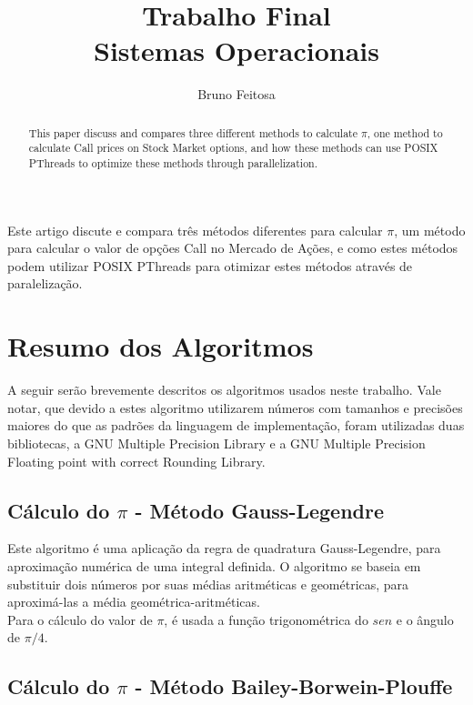 \documentclass[12pt]{article}
\title{Trabalho Final \\ Sistemas Operacionais}
\author{Bruno Feitosa\inst{1}}
\begin{document}
 

\maketitle

\begin{abstract}
This paper discuss and compares three different methods to calculate $\pi$,
one method to calculate Call prices on Stock Market options,
and how these methods can use POSIX PThreads to optimize these methods through parallelization.
\end{abstract}
     
\begin{resumo} 
Este artigo discute e compara três métodos diferentes para calcular $\pi$,
um método para calcular o valor de opções Call no Mercado de Ações,
e como estes métodos podem utilizar POSIX PThreads para otimizar estes métodos
através de paralelização.
\end{resumo}

\nocite{GNU:MP,GNU:MPFR}

\section{Resumo dos Algoritmos}

A seguir serão brevemente descritos os algoritmos usados neste trabalho.
Vale notar, que devido a estes algoritmo utilizarem números com tamanhos e precisões maiores
do que as padrões da linguagem de implementação, foram utilizadas duas bibliotecas,
a GNU Multiple Precision Library e a GNU Multiple Precision Floating point with correct
Rounding Library.\\

\subsection{Cálculo do $\pi$ - Método Gauss-Legendre}

Este algoritmo é uma aplicação da regra de quadratura Gauss-Legendre,
para aproximação numérica de uma integral definida.
O algoritmo se baseia em substituir dois números por suas médias aritméticas e geométricas,
para aproximá-las a média geométrica-aritméticas.\\
Para o cálculo do valor de $\pi$, é usada a função trigonométrica do $sen$ e o ângulo
de $\pi/4$.\\

\subsection{Cálculo do $\pi$ - Método Bailey-Borwein-Plouffe}
\end{document}
